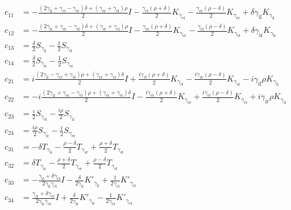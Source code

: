 \begin{align*}
  c_{11} &= -\frac{(2\gamma_\text{il} + \gamma_\text{el} - \gamma_\text{er})\delta + (\gamma_\text{er}+\gamma_\text{el})\rho}{2} I- \frac{\gamma_\text{el}(\rho+\delta)}{2} K_{\gamma_\text{el}}-\frac{\gamma_\text{er}(\rho-\delta)}{2} K_{\gamma_\text{er}} + \delta \gamma_\text{il} K_{\gamma_\text{il}} \\
  c_{12} &= -\frac{(2\gamma_\text{ir}+\gamma_\text{er}-\gamma_\text{el})\delta + (\gamma_\text{er}+\gamma_\text{el})\rho}{2} I- \frac{\gamma_\text{er}(\rho+\delta)}{2} K_{\gamma_\text{er}} - \frac{\gamma_\text{el}(\rho-\delta)}{2} K_{\gamma_\text{el}} + \delta \gamma_\text{ir} K_{\gamma_\text{ir}} \\
  c_{13} &= \frac{\delta}{2} S_{\gamma_\text{il}}- \frac{1}{2}S_{\gamma_\text{el}} \\
  c_{14} &= \frac{\delta}{2} S_{\gamma_\text{ir}}- \frac{1}{2}S_{\gamma_\text{er}} \\
  c_{21} &= i \frac{(2 \gamma_\text{il} -\gamma_\text{er} +\gamma_\text{el}) \rho+ (\gamma_\text{er}+\gamma_\text{el})\delta}{2} I + \frac{i\gamma_\text{el}(\rho+\delta)}{2} K_{\gamma_\text{el}} - \frac{i\gamma_\text{er}(\rho-\delta)}{2} K_{\gamma_\text{er}} -i \gamma_\text{il}\rho K_{\gamma_\text{il}} \\
  c_{22} &= -i \frac{(2 \gamma_\text{ir}+\gamma_\text{er} -\gamma_\text{el})\rho+(\gamma_\text{er}+\gamma_\text{el})\delta}{2} I-\frac{i\gamma_\text{er}(\rho+\delta)}{2} K_{\gamma_\text{er}} + \frac{i \gamma_\text{el}(\rho-\delta)}{2} K_{\gamma_\text{el}}+i \gamma_\text{ir}\rho K_{\gamma_\text{ir}} \\
  c_{23} &= \frac{i}{2} S_{\gamma_\text{el}} - \frac{i \rho}{2} S_{\gamma_\text{il}}\\
  c_{24} &= \frac{i \rho}{2} S_{\gamma_\text{ir}} - \frac{i}{2} S_{\gamma_\text{er}}\\
  c_{31} &= -\delta T_{\gamma_\text{il}}-\frac{\rho-\delta}{2} T_{\gamma_\text{er}} + \frac{\rho+\delta}{2} T_{\gamma_\text{el}} \\
  c_{32} &= \delta T_{\gamma_\text{ir}}-\frac{\rho+\delta}{2} T_{\gamma_\text{er}}+ \frac{\rho-\delta}{2} T_{\gamma_\text{el}} \\
  c_{33} &= -\frac{\gamma_\text{il} + \delta\gamma_\text{el}}{2 \gamma_\text{il}\gamma_\text{el}}I-\frac{\delta}{2 \gamma_\text{il}} K'_{\gamma_\text{il}} + \frac{1}{2 \gamma_\text{el}} K'_{\gamma_\text{el}} \\
  c_{34} &= \frac{\gamma_\text{ir} + \delta\gamma_\text{er}}{2 \gamma_\text{ir}\gamma_\text{er}}I+ \frac{\delta}{2 \gamma_\text{ir}} K'_{\gamma_\text{ir}} - \frac{1}{2 \gamma_\text{er}}K'_{\gamma_\text{er}} \\

\end{align*}
